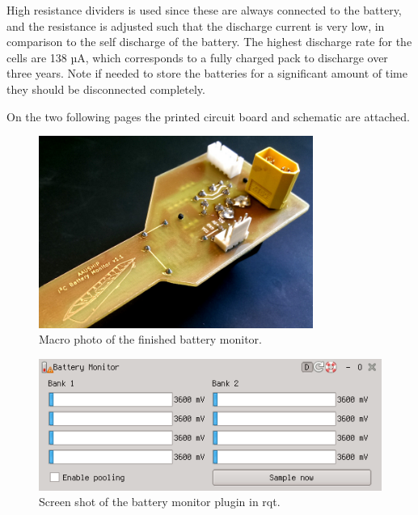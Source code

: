 High resistance dividers is used since these are always connected to
the battery, and the resistance is adjusted such that the discharge
current is very low, in comparison to the self discharge of the
battery. The highest discharge rate for the cells are 138 µA, which
corresponds to a fully charged pack to discharge over three years.
Note if needed to store the batteries for a significant amount of
time they should be disconnected completely.

On the two following pages the printed circuit board and schematic are
attached.

\begin{figure}[H]
	\centering
	\includegraphics[width=0.8\textwidth]{fig/bm-macro}
	\caption{Macro photo of the finished battery monitor.}
	\label{fig:bm-macro}
\end{figure}

\begin{figure}[H]
	\centering
	\includegraphics[width=\textwidth]{fig/bm-rqt}
	\caption{Screen shot of the battery monitor plugin in rqt.}
	\label{fig:bm-rqt}
\end{figure}



